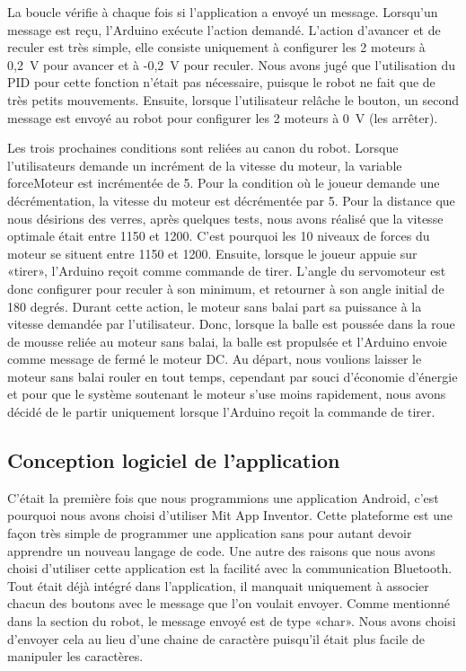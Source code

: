 La boucle vérifie à chaque fois si l’application a envoyé un message.
Lorsqu’un message est reçu, l’Arduino exécute l’action demandé.
L’action d’avancer et de reculer est très simple, elle consiste uniquement à configurer les 2 moteurs à 0,2~V pour avancer et à -0,2~V pour reculer.
Nous avons jugé que l’utilisation du PID pour cette fonction n’était pas nécessaire, puisque le robot ne fait que de très petits mouvements.
Ensuite, lorsque l’utilisateur relâche le bouton, un second message est envoyé au robot pour configurer les 2 moteurs à 0~V (les arrêter).

Les trois prochaines conditions sont reliées au canon du robot.
Lorsque l’utilisateurs demande un incrément de la vitesse du moteur, la variable forceMoteur est incrémentée de 5.
Pour la condition où le joueur demande une décrémentation, la vitesse du moteur est décrémentée par 5.
Pour la distance que nous désirions des verres, après quelques tests, nous avons réalisé que la vitesse optimale était entre 1150 et 1200.
C’est pourquoi les 10 niveaux de forces du moteur se situent entre 1150 et 1200.
Ensuite, lorsque le joueur appuie sur «tirer», l’Arduino reçoit comme commande de tirer.
L’angle du servomoteur est donc configurer pour reculer à son minimum, et retourner à son angle initial de 180 degrés.
Durant cette action, le moteur sans balai part sa puissance à la vitesse demandée par l’utilisateur.
Donc, lorsque la balle est poussée dans la roue de mousse reliée au moteur sans balai, la balle est propulsée et l’Arduino envoie comme message de fermé le moteur DC.
Au départ, nous voulions laisser le moteur sans balai rouler en tout temps, cependant par souci d’économie d’énergie et pour que le système soutenant le moteur s’use moins rapidement, nous avons décidé de le partir uniquement lorsque l’Arduino reçoit la commande de tirer.

\subsection{Conception logiciel de l'application}

C’était la première fois que nous programmions une application Android, c’est pourquoi nous avons choisi d’utiliser Mit App Inventor.
Cette plateforme est une façon très simple de programmer une application sans pour autant devoir apprendre un nouveau langage de code.
Une autre des raisons que nous avons choisi d’utiliser cette application est la facilité avec la communication Bluetooth.
Tout était déjà intégré dans l’application, il manquait uniquement à associer chacun des boutons avec le message que l’on voulait envoyer.
Comme mentionné dans la section du robot, le message envoyé est de type «char».
Nous avons choisi d’envoyer cela au lieu d’une chaine de caractère puisqu’il était plus facile de manipuler les caractères.

